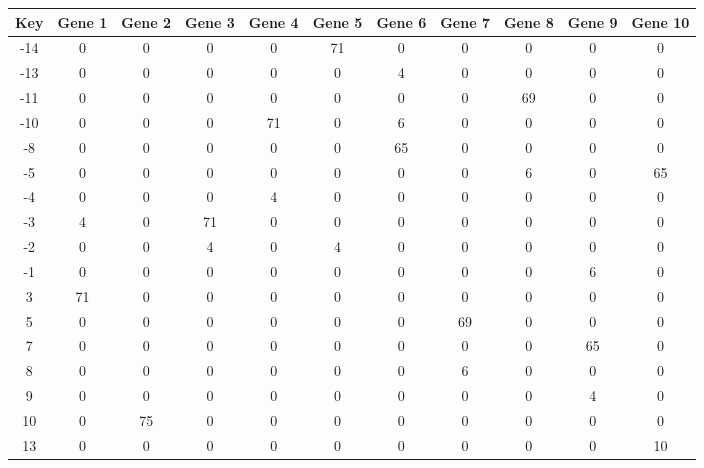 \begin{tabular}{|c|c|c|c|c|c|c|c|c|c|c|}
\hline
Key & Gene 1 & Gene 2 & Gene 3 & Gene 4 & Gene 5 & Gene 6 & Gene 7 & Gene 8 & Gene 9 & Gene 10 \\
\hline
-14 & 0 & 0 & 0 & 0 & 71 & 0 & 0 & 0 & 0 & 0 \\
-13 & 0 & 0 & 0 & 0 & 0 & 4 & 0 & 0 & 0 & 0 \\
-11 & 0 & 0 & 0 & 0 & 0 & 0 & 0 & 69 & 0 & 0 \\
-10 & 0 & 0 & 0 & 71 & 0 & 6 & 0 & 0 & 0 & 0 \\
-8 & 0 & 0 & 0 & 0 & 0 & 65 & 0 & 0 & 0 & 0 \\
-5 & 0 & 0 & 0 & 0 & 0 & 0 & 0 & 6 & 0 & 65 \\
-4 & 0 & 0 & 0 & 4 & 0 & 0 & 0 & 0 & 0 & 0 \\
-3 & 4 & 0 & 71 & 0 & 0 & 0 & 0 & 0 & 0 & 0 \\
-2 & 0 & 0 & 4 & 0 & 4 & 0 & 0 & 0 & 0 & 0 \\
-1 & 0 & 0 & 0 & 0 & 0 & 0 & 0 & 0 & 6 & 0 \\
3 & 71 & 0 & 0 & 0 & 0 & 0 & 0 & 0 & 0 & 0 \\
5 & 0 & 0 & 0 & 0 & 0 & 0 & 69 & 0 & 0 & 0 \\
7 & 0 & 0 & 0 & 0 & 0 & 0 & 0 & 0 & 65 & 0 \\
8 & 0 & 0 & 0 & 0 & 0 & 0 & 6 & 0 & 0 & 0 \\
9 & 0 & 0 & 0 & 0 & 0 & 0 & 0 & 0 & 4 & 0 \\
10 & 0 & 75 & 0 & 0 & 0 & 0 & 0 & 0 & 0 & 0 \\
13 & 0 & 0 & 0 & 0 & 0 & 0 & 0 & 0 & 0 & 10 \\
\hline
\end{tabular}